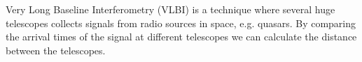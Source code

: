 Very Long Baseline Interferometry (VLBI) is a technique where several huge
telescopes collects signals from radio sources in space, e.g. quasars. By
comparing the arrival times of the signal at different telescopes we can
calculate the distance between the telescopes.

\endinput
